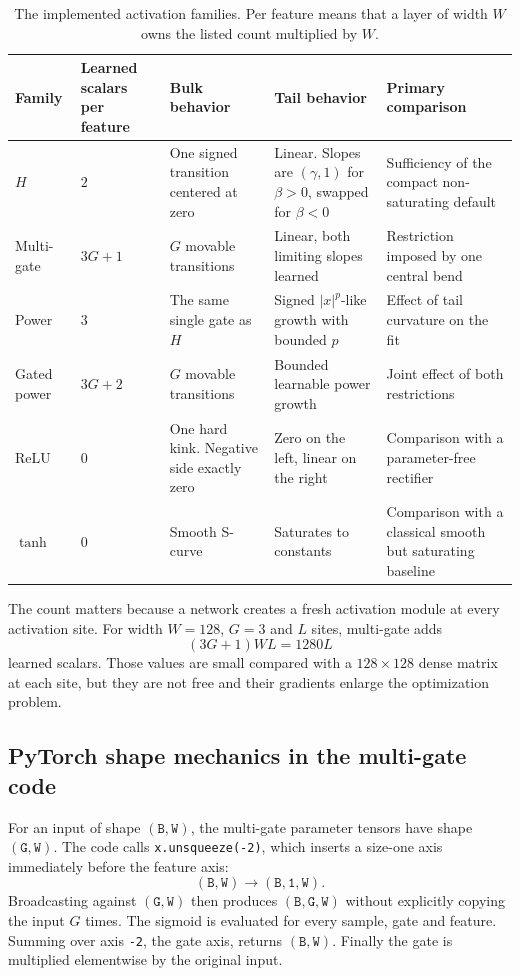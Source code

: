 \documentclass[10pt,aps,prd,twocolumn,nofootinbib]{revtex4-2}
\newcommand{\code}[1]{\texttt{#1}}
\newcommand{\shape}[1]{\ensuremath{\mathtt{#1}}}
\begin{document}
\begin{table}[t]
\centering
\begin{tabular}{p{}p{}p{}
                p{}p{}}
\toprule
Family & Learned scalars per feature & Bulk behavior & Tail behavior &
Primary comparison \\
\midrule
\(H\) & \(2\) & One signed transition centered at zero & Linear.  Slopes are
$(\gamma,1)$ for $\beta>0$, swapped for $\beta<0$ & Sufficiency of the compact
non-saturating default \\
Multi-gate & \(3G+1\) & \(G\) movable transitions & Linear, both limiting
slopes learned & Restriction imposed by one central bend \\
Power & \(3\) & The same single gate as \(H\) & Signed
\(|x|^p\)-like growth with bounded \(p\) & Effect of tail curvature on the fit \\
Gated power & \(3G+2\) & \(G\) movable transitions & Bounded learnable power
growth & Joint effect of both restrictions \\
ReLU & \(0\) & One hard kink.  Negative side exactly zero & Zero on the left,
linear on the right & Comparison with a parameter-free rectifier \\
\(\tanh\) & \(0\) & Smooth S-curve & Saturates to constants & Comparison with
a classical smooth but saturating baseline \\
\bottomrule
\end{tabular}
\caption{The implemented activation families.  Per feature means that a layer
of width \(W\) owns the listed count multiplied by \(W\).}
\label{tab:activation-compare}
\end{table}

The count matters because a network creates a fresh activation module at
every activation site.  For width \(W=128\), \(G=3\) and \(L\) sites,
multi-gate adds
\begin{equation*}
  (3G+1)WL=1280L
\end{equation*}
learned scalars.  Those values are small compared with a
\(128\times128\) dense matrix at each site, but they are not free and their
gradients enlarge the optimization problem.

\subsection{PyTorch shape mechanics in the multi-gate code}

For an input of shape \shape{(B,W)}, the multi-gate parameter tensors have
shape \shape{(G,W)}.  The code calls \code{x.unsqueeze(-2)}, which inserts a
size-one axis immediately before the feature axis:
\begin{equation*}
  \shape{(B,W)}\longrightarrow\shape{(B,1,W)}.
\end{equation*}
Broadcasting against \shape{(G,W)} then produces
\shape{(B,G,W)} without explicitly copying the input \(G\) times.  The
sigmoid is evaluated for every sample, gate and feature.  Summing over axis
\code{-2}, the gate axis, returns \shape{(B,W)}.  Finally the gate is
multiplied elementwise by the original input.
\end{document}
